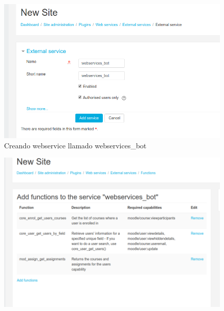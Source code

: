 \begin{enumerate}
\begin{tabular}{|p{5cm}|p{8cm}|}
 &
 

  \\
  \hline
\end{tabular}

\begin{figure}[H] %
\centering
\includegraphics[scale=0.5]{imagenes/moodle/Screenshot_2017-08-25_11-24-11.png}  %

\caption{Creando webservice llamado webservices\_bot}\label{figura415}
\end{figure}

\begin{figure}[H] %
\centering
\includegraphics[scale=0.3]{imagenes/moodle/Screenshot_2017-08-25_11-27-44.png}  %


\end{figure}
\end{enumerate}
